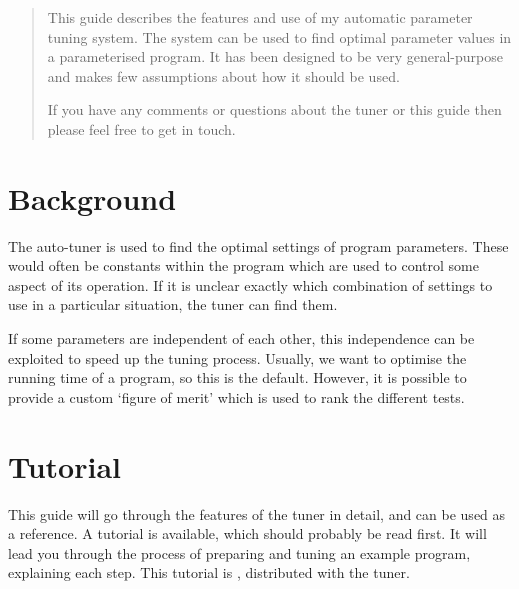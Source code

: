 \documentclass[a4paper, draft]{article}
\begin{document}
\maketitle

\begin{abstract}
This guide describes the features and use of my automatic parameter tuning 
system. The system can be used to find optimal parameter values in a 
parameterised program. It has been designed to be very general-purpose and 
makes few assumptions about how it should be used.

If you have any comments or questions about the tuner or this guide then
please feel free to get in touch.
\end{abstract}


\tableofcontents

\newpage


\section{Background}
\label{sec:intro}
The auto-tuner is used to find the optimal settings of program parameters. 
These would often be constants within the program which are used to control 
some aspect of its operation. If it is unclear exactly which combination of 
settings to use in a particular situation, the tuner can find them. 

If some 
parameters are independent of each other, this independence can be exploited 
to speed up the tuning process. Usually, we want to optimise the running time 
of a program, so this is the default. However, it is possible to provide a 
custom `figure of merit' which is used to rank the different tests.







\section{Tutorial}
\label{sec:tutorial}
This guide will go through the features of the tuner in detail, and can be 
used as a reference. A tutorial is available, which should probably be read 
first. It will lead you through the process of preparing and tuning an 
example program, explaining each step. This tutorial is 
, distributed with the tuner.
\end{document}
